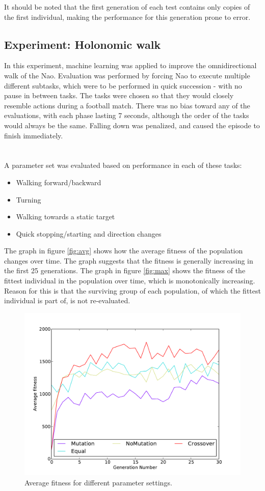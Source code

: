 \documentclass{article}
\begin{document}
It should be noted that the first generation of each test contains only copies of the first individual, making 
the performance for this generation prone to error. 


\subsection{Experiment: Holonomic walk}
In this experiment, machine learning was applied to improve the omnidirectional walk of the Nao. Evaluation was performed by forcing Nao to execute multiple different subtasks, which were to be performed in quick succession - with no pause in between tasks. The tasks were chosen so that they would closely resemble actions during a football match. There was no bias toward any of the evaluations, with each phase lasting 7 seconds, although the order of the tasks would always be the same. Falling down was penalized, and caused the episode to finish immediately. \\\\\\

A parameter set was evaluated based on performance in each of these tasks:
\begin{itemize}
\item Walking forward/backward
\item Turning
\item Walking towards a static target
\item Quick stopping/starting and direction changes
\end{itemize}

The graph in figure \ref{fig:avg} shows how the average fitness of the
population changes over time. The graph suggests that the fitness is generally
increasing in the first 25 generations. The graph in figure \ref{fig:max} shows the fitness of the fittest individual in the population over time, which is monotonically increasing. Reason for this is that the surviving group of each population, of which the fittest individual is part of, is not re-evaluated. 

\begin{figure}[h!]
	\center
	\includegraphics[width=.65\textwidth]{images/relevant_avg.pdf}
	\caption{Average fitness for different parameter settings.}
	\label{fig:avgforward}
\end{figure}
\end{document}
